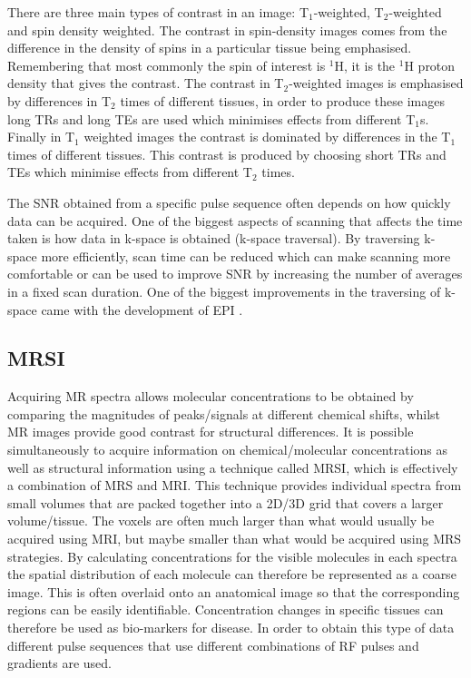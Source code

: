 \noindent There are three main types of contrast in an image: T$_1$-weighted, T$_2$-weighted and spin density weighted. The contrast in spin-density images comes from the difference in the density of spins in a particular tissue being emphasised. Remembering that most commonly the spin of interest is $^1$H, it is the $^1$H proton density that gives the contrast. The contrast in T$_2$-weighted images is emphasised by differences in T$_2$ times of different tissues, in order to produce these images long \ac{TR}s and long \ac{TE}s are used which minimises effects from different T$_1$s. Finally in T$_1$ weighted images the contrast is dominated by differences in the T$_1$ times of different tissues. This contrast is produced by choosing short \ac{TR}s and \ac{TE}s which minimise effects from different T$_2$ times. 

The \ac{SNR} obtained from a specific pulse sequence often depends on how quickly data can be acquired. One of the biggest aspects of scanning that affects the time taken is how data in k-space is obtained (k-space traversal). By traversing k-space more efficiently, scan time can be reduced which can make scanning more comfortable or can be used to improve \ac{SNR} by increasing the number of averages in a fixed scan duration. One of the biggest improvements in the traversing of k-space came with the development of \ac{EPI} \cite{Stehling1991Echo-planarSecond}.

\subsection{MRSI}

Acquiring MR spectra allows molecular concentrations to be obtained by comparing the magnitudes of peaks/signals at different chemical shifts, whilst MR images provide good contrast for structural differences. It is possible simultaneously to acquire information on chemical/molecular concentrations as well as structural information using a technique called \ac{MRSI}, which is effectively a combination of \ac{MRS} and MRI. This technique provides individual spectra from small volumes that are packed together into a 2D/3D grid that covers a larger volume/tissue. The voxels are often much larger than what would usually be acquired using \ac{MRI}, but maybe smaller than what would be acquired using \ac{MRS} strategies. By calculating concentrations for the visible molecules in each spectra the spatial distribution of each molecule can therefore be represented as a coarse image. This is often overlaid onto an anatomical image so that the corresponding regions can be easily identifiable. Concentration changes in specific tissues can therefore be used as bio-markers for disease. In order to obtain this type of data different pulse sequences that use different combinations of \ac{RF} pulses and gradients are used. 

